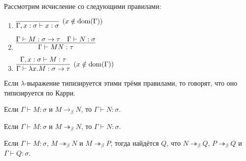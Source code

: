 \begin{definition}
    Рассмотрим исчисление со следующими правилами:
    \begin{enumerate}
        \item $\infer[(x \notin \mathrm{dom}(\Gamma))]
            {\Gamma, x:\sigma \vdash x:\sigma}
            {}$
        \item $\infer[]
            {\Gamma \vdash M N : \tau}
            {\Gamma \vdash M:\sigma \rightarrow \tau & \Gamma \vdash N:\sigma}$
        \item $\infer[(x \notin \mathrm{dom}(\Gamma))]
            {\Gamma \vdash \lambda x . M : \sigma \rightarrow \tau}
            {\Gamma, x : \sigma \vdash M : \tau}$
    \end{enumerate}


    Если $\lambda$-выражение типизируется этими трёмя правилами, то говорят, что оно типизируется по Карри.
\end{definition}

\begin{lemma}
    Если $\Gamma \vdash M : \sigma$ и $M \rightarrow_{\beta}N$, то $\Gamma \vdash N : \sigma$.
\end{lemma}

\begin{corollary}
    Если $\Gamma \vdash M : \sigma$ и $M \twoheadrightarrow_{\beta}N$, то $\Gamma \vdash N : \sigma$.
\end{corollary}

\begin{theorem}
    Если $\Gamma \vdash M : \sigma$, $M \twoheadrightarrow_{\beta} N$ и $M \twoheadrightarrow_{\beta} P$, тогда найдётся $Q$, что
    $N \twoheadrightarrow_{\beta} Q$, $P \twoheadrightarrow_{\beta} Q$ и $\Gamma \vdash Q : \sigma$.
\end{theorem}

